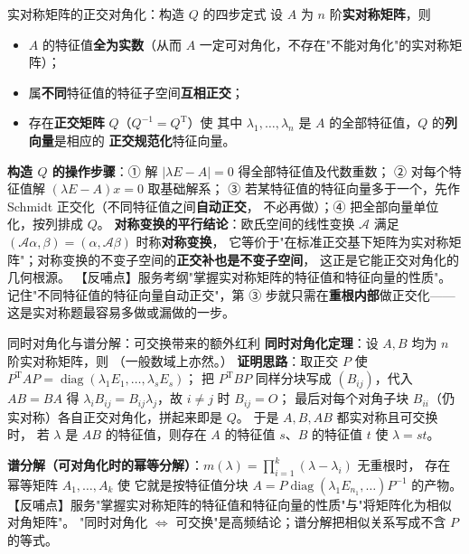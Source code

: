 \begin{fdeep}{实对称矩阵的正交对角化：构造 $Q$ 的四步定式}
设 $A$ 为 $n$ 阶\textbf{实对称矩阵}，则
\begin{itemize}[leftmargin=1.8em,itemsep=0.15em]
\item $A$ 的特征值\textbf{全为实数}（从而 $A$ 一定可对角化，不存在"不能对角化"的实对称矩阵）；
\item 属\textbf{不同}特征值的特征子空间\textbf{互相正交}；
\item 存在\textbf{正交矩阵} $Q$（$Q^{-1}=Q^{\mathrm T}$）使
      其中 $\lambda_1,\dots,\lambda_n$ 是 $A$ 的全部特征值，$Q$ 的\textbf{列向量}是相应的
      \textbf{正交规范化}特征向量。
\end{itemize}
\textbf{构造 $Q$ 的操作步骤}：① 解 $\lvert\lambda E-A\rvert=0$ 得全部特征值及代数重数；
② 对每个特征值解 $(\lambda E-A)x=0$ 取基础解系；
③ 若某特征值的特征向量多于一个，先作 Schmidt 正交化（不同特征值之间\textbf{自动正交}，
不必再做）；④ 把全部向量单位化，按列排成 $Q$。
\textbf{对称变换的平行结论}：欧氏空间的线性变换 $\mathcal A$ 满足
$(\mathcal A\alpha,\beta)=(\alpha,\mathcal A\beta)$ 时称\textbf{对称变换}，
它等价于"在标准正交基下矩阵为实对称矩阵"；对称变换的不变子空间的\textbf{正交补也是不变子空间}，
这正是它能正交对角化的几何根源。
【反哺点】服务考纲"掌握实对称矩阵的特征值和特征向量的性质"。
记住"不同特征值的特征向量自动正交"，第 ③ 步就只需在\textbf{重根内部}做正交化——
这是实对称题最容易多做或漏做的一步。
\end{fdeep}

\begin{fdeep}{同时对角化与谱分解：可交换带来的额外红利}
\textbf{同时对角化定理}：设 $A,B$ 均为 $n$ 阶实对称矩阵，则
（一般数域上亦然。）
\textbf{证明思路}：取正交 $P$ 使
$P^{\mathrm T}AP=\operatorname{diag}(\lambda_1E_1,\dots,\lambda_sE_s)$；
把 $P^{\mathrm T}BP$ 同样分块写成 $(B_{ij})$，代入 $AB=BA$ 得
$\lambda_iB_{ij}=B_{ij}\lambda_j$，故 $i\ne j$ 时 $B_{ij}=O$；
最后对每个对角子块 $B_{ii}$（仍实对称）各自正交对角化，拼起来即是 $Q$。
于是 $A,B,AB$ 都实对称且可交换时，
若 $\lambda$ 是 $AB$ 的特征值，则存在 $A$ 的特征值 $s$、$B$ 的特征值 $t$ 使 $\lambda=st$。

\textbf{谱分解（可对角化时的幂等分解）}：$m(\lambda)=\prod_{i=1}^{k}(\lambda-\lambda_i)$ 无重根时，
存在幂等矩阵 $A_1,\dots,A_k$ 使
它就是按特征值分块 $A=P\operatorname{diag}(\lambda_1E_{n_1},\dots)P^{-1}$ 的产物。
【反哺点】服务"掌握实对称矩阵的特征值和特征向量的性质"与"将矩阵化为相似对角矩阵"。
"同时对角化 $\iff$ 可交换"是高频结论；谱分解把相似关系写成不含 $P$ 的等式。
\end{fdeep}

